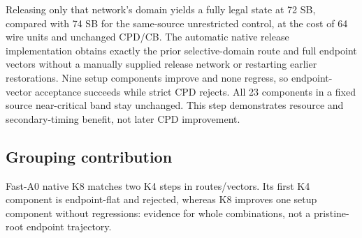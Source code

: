 \documentclass[conference,10pt]{IEEEtran}
\begin{document}
Releasing only that network's domain yields a fully legal state at 72 SB, compared with 74 SB for the same-source unrestricted control, at the cost of 64 wire units and unchanged CPD/CB. The automatic native release implementation obtains exactly the prior selective-domain route and full endpoint vectors without a manually supplied release network or restarting earlier restorations. Nine setup components improve and none regress, so endpoint-vector acceptance succeeds while strict CPD rejects. All 23 components in a fixed source near-critical band stay unchanged. This step demonstrates resource and secondary-timing benefit, not later CPD improvement.

\subsection{Grouping contribution}
Fast-A0 native K8 matches two K4 steps in routes/vectors. Its first K4 component is endpoint-flat and rejected, whereas K8 improves one setup component without regressions: evidence for whole combinations, not a pristine-root endpoint trajectory.
\end{document}
